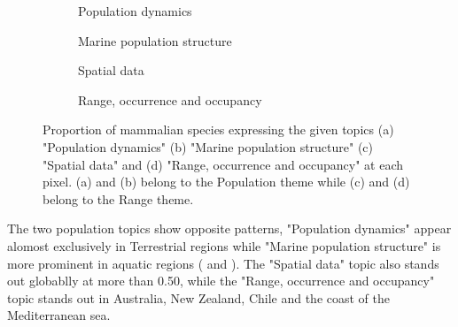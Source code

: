 \begin{figure}[!htbp]
    \centering
        \begin{subfigure}[t]{0.49\textwidth}
        \centering
        \caption{Population dynamics}
        
        \label{subfig:pop dyn}
        \end{subfigure}
        \begin{subfigure}[t]{0.49\textwidth}
        \centering
        \caption{Marine population structure}
        
        \label{subfig:mar pop}
        \end{subfigure}
        \begin{subfigure}[t]{0.49\textwidth}
        \centering
        \caption{Spatial data}
        
        \label{subfig:spa dat}
        \end{subfigure}
        \begin{subfigure}[t]{0.49\textwidth}
        \centering
        \caption{Range, occurrence and occupancy}
        
        \label{subfig:ran occ occ}
        \end{subfigure}
    \caption{Proportion of mammalian species expressing the given topics (a) "Population dynamics" (b) "Marine population structure" (c) "Spatial data" and (d) "Range, occurrence and occupancy" at each pixel. (a) and (b) belong to the Population theme while (c) and (d) belong to the Range theme.}
    \label{fig:pop ran theme}
\end{figure}
\FloatBarrier

The two population topics show opposite patterns, "Population dynamics" appear alomost exclusively in Terrestrial regions while "Marine population structure" is more prominent in aquatic regions ( and ). The "Spatial data" topic also stands out globablly at more than 0.50, while the "Range, occurrence and occupancy" topic stands out in Australia, New Zealand, Chile and the coast of the Mediterranean sea.

